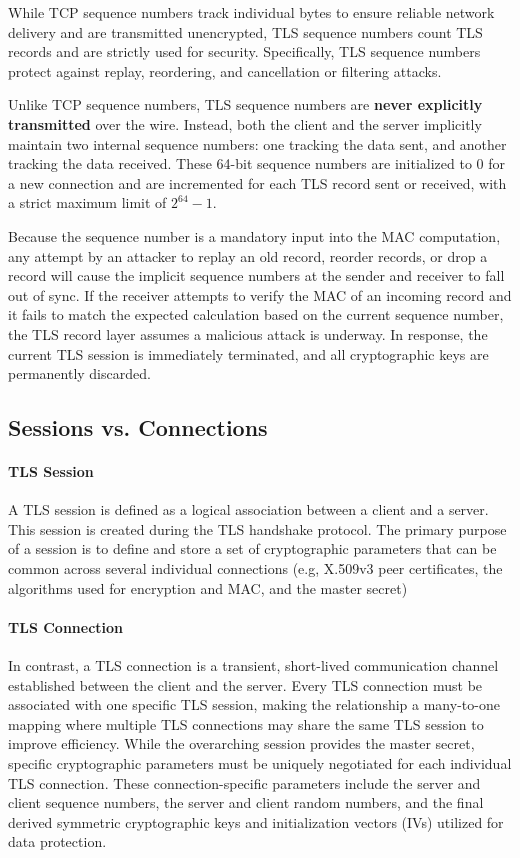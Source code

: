 While TCP sequence numbers track individual bytes to ensure reliable network delivery and are transmitted unencrypted, TLS sequence numbers count TLS records and are strictly used for security. Specifically, TLS sequence numbers protect against replay, reordering, and cancellation or filtering attacks.

Unlike TCP sequence numbers, TLS sequence numbers are \textbf{never explicitly transmitted} over the wire. Instead, both the client and the server implicitly maintain two internal sequence numbers: one tracking the data sent, and another tracking the data received. These 64-bit sequence numbers are initialized to $0$ for a new connection and are incremented for each TLS record sent or received, with a strict maximum limit of $2^{64}-1$.

Because the sequence number is a mandatory input into the MAC computation, any attempt by an attacker to replay an old record, reorder records, or drop a record will cause the implicit sequence numbers at the sender and receiver to fall out of sync. If the receiver attempts to verify the MAC of an incoming record and it fails to match the expected calculation based on the current sequence number, the TLS record layer assumes a malicious attack is underway. In response, the current TLS session is immediately terminated, and all cryptographic keys are permanently discarded.

\subsection{Sessions vs. Connections}

\paragraph{TLS Session}
A TLS session is defined as a logical association between a client and a server. This session is created during the TLS handshake protocol. The primary purpose of a session is to define and store a set of cryptographic parameters that can be common across several individual connections (e.g, X.509v3 peer certificates, the algorithms used for encryption and MAC, and the master secret)

\paragraph{TLS Connection}
In contrast, a TLS connection is a transient, short-lived communication channel established between the client and the server. Every TLS connection must be associated with one specific TLS session, making the relationship a many-to-one mapping where multiple TLS connections may share the same TLS session to improve efficiency. While the overarching session provides the master secret, specific cryptographic parameters must be uniquely negotiated for each individual TLS connection. These connection-specific parameters include the server and client sequence numbers, the server and client random numbers, and the final derived symmetric cryptographic keys and initialization vectors (IVs) utilized for data protection.

